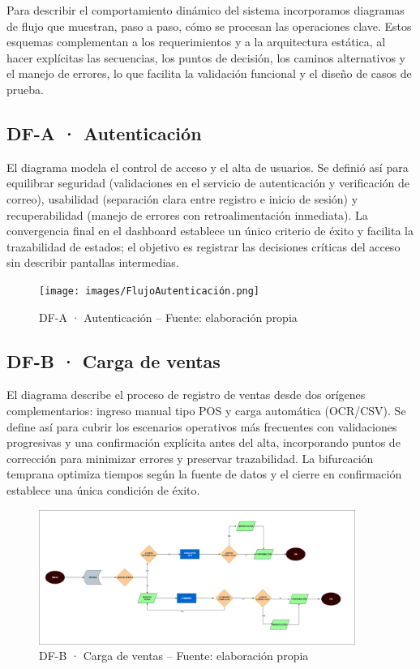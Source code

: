 Para describir el comportamiento dinámico del sistema incorporamos diagramas de flujo que muestran, paso a paso, cómo se procesan las operaciones clave. Estos esquemas complementan a los requerimientos y a la arquitectura estática, al hacer explícitas las secuencias, los puntos de decisión, los caminos alternativos y el manejo de errores, lo que facilita la validación funcional y el diseño de casos de prueba.


\subsection{DF-A · Autenticación}
El diagrama modela el control de acceso y el alta de usuarios. Se definió así para equilibrar seguridad (validaciones en el servicio de autenticación y verificación de correo), usabilidad (separación clara entre registro e inicio de sesión) y recuperabilidad (manejo de errores con retroalimentación inmediata). La convergencia final en el dashboard establece un único criterio de éxito y facilita la trazabilidad de estados; el objetivo es registrar las decisiones críticas del acceso sin describir pantallas intermedias.

\begin{figure}[!htbp]
  \centering
  \texttt{[image: images/FlujoAutenticación.png]}
  \caption{DF-A · Autenticación -- Fuente: elaboración propia}
  \label{fig:df-a-autenticacion}
\end{figure}


\subsection{DF-B · Carga de ventas}
El diagrama describe el proceso de registro de ventas desde dos orígenes complementarios: ingreso manual tipo POS y carga automática (OCR/CSV). Se define así para cubrir los escenarios operativos más frecuentes con validaciones progresivas y una confirmación explícita antes del alta, incorporando puntos de corrección para minimizar errores y preservar trazabilidad. La bifurcación temprana optimiza tiempos según la fuente de datos y el cierre en confirmación establece una única condición de éxito.

\begin{figure}[!htbp]
  \centering
  \includegraphics[width=0.92\textwidth]{images/FlujoVentas.drawio.png}
  \caption{DF-B · Carga de ventas -- Fuente: elaboración propia}
  \label{fig:df-b-ventas}
\end{figure}


